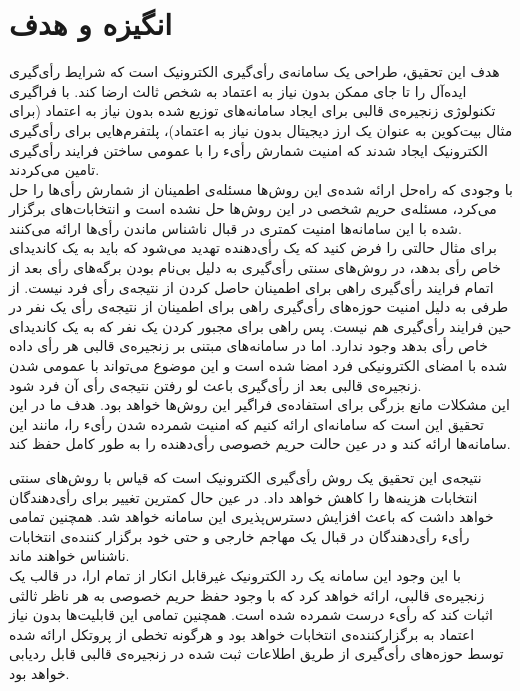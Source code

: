 \section{انگیزه و هدف}
هدف این تحقیق، طراحی یک سامانه‌ی رأی‌گیری الکترونیک است که شرایط رأی‌گیری ایده‌آل را تا جای ممکن بدون نیاز به اعتماد به شخص ثالث ارضا کند. با فراگیری تکنولوژی زنجیره‌ی قالبی برای ایجاد سامانه‌های توزیع شده بدون نیاز به اعتماد (برای مثال بیت‌کوین به عنوان یک‌ ارز دیجیتال بدون نیاز به اعتماد)، پلتفرم‌هایی برای رأی‌گیری الکترونیک ایجاد شدند که امنیت شمارش رأیء را با عمومی ساختن فرایند رأی‌گیری تامین می‌کردند. 
\\
با وجودی که راه‌حل ارائه شده‌ی این روش‌ها مسئله‌ی اطمینان از شمارش رأی‌ها را حل می‌کرد، مسئله‌ی حریم شخصی در این روش‌ها حل نشده است و انتخابات‌های برگزار شده با این سامانه‌ها امنیت کمتری در قبال ناشناس ماندن رأی‌ها ارائه می‌کنند. 
\\
برای مثال حالتی را فرض کنید که یک رأی‌دهنده تهدید می‌شود که باید به یک کاندیدای خاص رأی بدهد، در روش‌های سنتی رأی‌گیری به دلیل بی‌نام بودن برگه‌های رأی بعد از اتمام فرایند رأی‌گیری راهی برای اطمینان حاصل کردن از نتیجه‌ی رأی فرد نیست. از طرفی به دلیل امنیت حوزه‌های رأی‌گیری راهی برای اطمینان از نتیجه‌ی رأی یک نفر در حین فرایند رأی‌گیری هم نیست. پس راهی برای مجبور کردن یک نفر که به یک کاندیدای خاص رأی بدهد وجود ندارد. اما در سامانه‌های مبتنی بر زنجیره‌ی قالبی هر رأی داده شده با امضای الکترونیکی فرد امضا شده است و این موضوع می‌تواند با عمومی شدن زنجیره‌ی قالبی بعد از رأی‌گیری باعث لو رفتن نتیجه‌ی رأی آن فرد شود.
\\
این مشکلات مانع بزرگی برای استفاده‌ی فراگیر این روش‌ها خواهد بود. هدف ما در این تحقیق این است که سامانه‌ای ارائه کنیم که امنیت شمرده شدن رأیء را، مانند این سامانه‌ها ارائه کند و در عین حالت حریم خصوصی رأی‌دهنده را به طور کامل حفظ کند. 
\par
نتیجه‌ی این تحقیق یک روش‌ رأی‌گیری الکترونیک است که قیاس با روش‌های سنتی انتخابات هزینه‌ها را کاهش خواهد داد. در عین حال کمترین تغییر برای رأی‌دهندگان خواهد داشت که باعث افزایش دسترس‌پذیری این سامانه خواهد شد. همچنین تمامی رأیء رأی‌دهندگان در قبال یک مهاجم خارجی و حتی خود برگزار کننده‌ی انتخابات ناشناس خواهند ماند. 
\\
با این وجود این سامانه یک رد الکترونیک غیرقابل انکار از تمام ارا، در قالب یک زنجیره‌ی قالبی، ارائه ‌خواهد کرد که با وجود حفظ حریم خصوصی به هر ناظر ثالثی اثبات کند که رأیء درست شمرده شده است. همچنین تمامی این قابلیت‌ها بدون نیاز اعتماد به برگزارکننده‌ی انتخابات خواهد بود و هرگونه تخطی از پروتکل ارائه شده توسط حوزه‌های رأی‌گیری از طریق اطلاعات ثبت شده در زنجیره‌ی قالبی قابل ردیابی خواهد بود.









